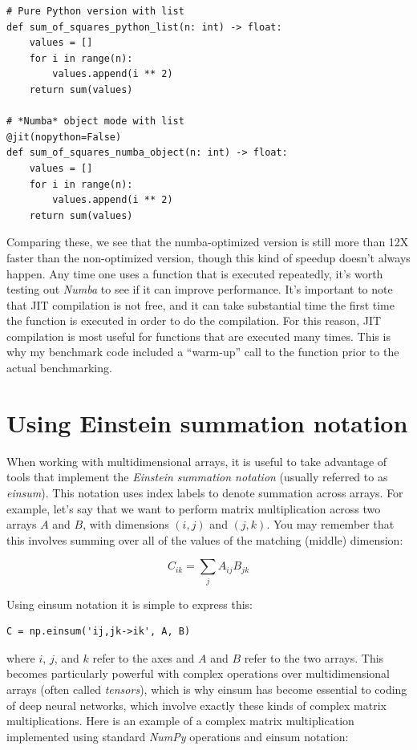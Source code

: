\begin{lstlisting}[style=Python]
# Pure Python version with list
def sum_of_squares_python_list(n: int) -> float:
    values = []
    for i in range(n):
        values.append(i ** 2)
    return sum(values)

# *Numba* object mode with list
@jit(nopython=False)
def sum_of_squares_numba_object(n: int) -> float:
    values = [] 
    for i in range(n):
        values.append(i ** 2)
    return sum(values)
\end{lstlisting}

Comparing these, we see that the numba-optimized version is still more than 12X faster than the non-optimized version, though this kind of speedup doesn't always happen.  Any time one uses a function that is executed repeatedly, it's worth testing out \textit{Numba} to see if it can improve performance.  It's important to note that JIT compilation is not free, and it can take substantial time the first time the function is executed in order to do the compilation. For this reason, JIT compilation is most useful for functions that are executed many times.  This is why my benchmark code included a ``warm-up'' call to the function prior to the actual benchmarking.

\section{Using Einstein summation notation}

When working with multidimensional arrays, it is useful to take advantage of tools that implement the \textit{Einstein summation notation} (usually referred to as \textit{einsum}).  This notation uses index labels to denote summation across arrays. For example, let's say that we want to perform matrix multiplication across two arrays $A$ and $B$, with dimensions $(i, j)$ and $(j, k)$.  You may remember that this involves summing over all of the values of the matching (middle) dimension:

\begin{equation}
C_{ik} = \sum_{j} A_{ij} B_{jk}
\end{equation}

Using einsum notation it is simple to express this:

\begin{lstlisting}[style=Pythonshort]
C = np.einsum('ij,jk->ik', A, B)
\end{lstlisting}

where $i$, $j$, and $k$ refer to the axes and $A$ and $B$ refer to the two arrays.  This becomes particularly powerful with complex operations over multidimensional arrays (often called \textit{tensors}), which is why einsum has become essential to coding of deep neural networks, which involve exactly these kinds of complex matrix multiplications.  Here is an example of a complex matrix multiplication implemented using standard \textit{NumPy} operations and einsum notation:

